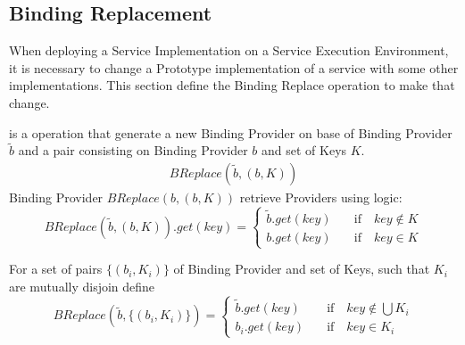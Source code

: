  \subsection{Binding Replacement}
 
 When deploying a Service Implementation on a Service Execution Environment, it is necessary to change a Prototype implementation of a service with some other implementations. This section define the Binding Replace operation to make that change.
 
 \begin{defi}
   is a operation that generate a new Binding Provider on base of Binding Provider $\tilde{b}$ and a pair consisting on Binding Provider $b$ and set of Keys $K$.
 \begin{eqnarray}
 BReplace(\tilde{b},(b,K))
 \end{eqnarray}
 Binding Provider $BReplace(b,(b,K))$ retrieve Providers using logic:
 \begin{equation}
 BReplace(\tilde{b},(b,K)).get(key) = \left\{\begin{aligned}
          \tilde{b}.get(key) & \quad \text{if} \quad key\notin K\\
          b.get(key) & \quad \text{if} \quad key\in K
        \end{aligned}\right.
 \end{equation}
 
 
  For a set of pairs $\{(b_i,K_i)\}$ of Binding Provider and set of Keys, such that $K_i$ are mutually disjoin define
 \begin{equation}
 BReplace(\tilde{b},\{(b_i,K_i)\}) = \left\{\begin{aligned}
          \tilde{b}.get(key) & \quad \text{if} \quad key\notin \bigcup K_i\\
          b_i.get(key) & \quad \text{if} \quad key\in K_i
        \end{aligned}\right.
 \end{equation}
 
 \end{defi}
 


